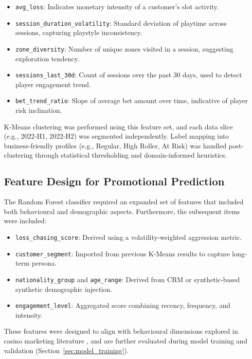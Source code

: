 \documentclass[12pt,a4paper]{report}
\begin{document}
\begin{itemize}
  \item \texttt{avg\_loss}: Indicates monetary intensity of a customer’s slot activity.
  \item \texttt{session\_duration\_volatility}: Standard deviation of playtime across sessions, capturing playstyle inconsistency.
  \item \texttt{zone\_diversity}: Number of unique zones visited in a session, suggesting exploration tendency.
  \item \texttt{sessions\_last\_30d}: Count of sessions over the past 30 days, used to detect player engagement trend.
  \item \texttt{bet\_trend\_ratio}: Slope of average bet amount over time, indicative of player risk inclination.
\end{itemize}

K-Means clustering was performed using this feature set, and each data slice (e.g., 2022-H1, 2022-H2) was segmented independently. Label mapping into business-friendly profiles (e.g., Regular, High Roller, At Risk) was handled post-clustering through statistical thresholding and domain-informed heuristics.

\subsection{Feature Design for Promotional Prediction}

The Random Forest classifier required an expanded set of features that included both behavioural and demographic aspects.  Furthermore, the subsequent items were included:

\begin{itemize}
  \item \texttt{loss\_chasing\_score}: Derived using a volatility-weighted aggression metric.
  \item \texttt{customer\_segment}: Imported from previous K-Means results to capture long-term persona.
  \item \texttt{nationality\_group} and \texttt{age\_range}: Derived from CRM or synthetic-based synthetic demographic injection.
  \item \texttt{engagement\_level}: Aggregated score combining recency, frequency, and intensity.
\end{itemize}

These features were designed to align with behavioural dimensions explored in casino marketing literature \citep{Abarbanel2022}, and are further evaluated during model training and validation (Section~\ref{sec:model_training}).
\end{document}
